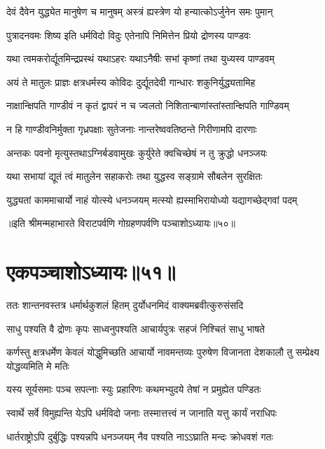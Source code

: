 \twolineshloka
{देवं दैवेन युद्ध्येत मानुषेण च मानुषम्}
{अस्त्रं ह्यस्त्रेण यो हन्यात्कोऽर्जुनेन समः पुमान्}


\twolineshloka
{पुत्रादनवमः शिष्य इति धर्मविदो विदुः}
{एतेनापि निमित्तेन प्रियो द्रोणस्य पाण्डवः}


\twolineshloka
{यथा त्वमकरोर्द्यूतमिन्द्रप्रस्थं यथाऽहरः}
{यथाऽनैषीः सभां कृष्णां तथा युध्यस्व पाण्डवम्}


\twolineshloka
{अयं ते मातुलः प्राज्ञः क्षत्रधर्मस्य कोविदः}
{दुर्द्यूतदेवी गान्धारः शकुनिर्युद्ध्यतामिह}


\twolineshloka
{नाक्षान्क्षिपति गाण्डीवं न कृतं द्वापरं न च}
{ज्वलतो निशितान्बाणांस्तांस्तान्क्षिपति गाण्डिवम्}


\twolineshloka
{न हि गाण्डीवनिर्मुक्ता गृध्रपक्षाः सुतेजनाः}
{नान्तरेष्ववतिष्ठन्ते गिरीणामपि दारणाः}


\twolineshloka
{अन्तकः पवनो मृत्युस्तथाऽग्निर्बडवामुखः}
{कुर्युरेते क्वचिच्छेषं न तु क्रुद्धो धनञ्जयः}


\twolineshloka
{यथा सभायां द्यूतं त्वं मातुलेन सहाकरोः}
{तथा युद्धस्व सङ्ग्रामे सौबलेन सुरक्षितः}


\twolineshloka
{युद्ध्यतां काममाचार्यो नाहं योत्स्ये धनञ्जयम्}
{मत्स्यो ह्यस्माभिरायोध्यो यद्यागच्छेद्गवां पदम्}

॥इति श्रीमन्महाभारते विराटपर्वणि गोग्रहणपर्वणि पञ्चाशोऽध्यायः॥५०॥

\chapter{एकपञ्चाशोऽध्यायः॥५१॥}

\twolineshloka
{ततः शान्तनवस्तत्र धर्मार्थकुशलं हितम्}
{दुर्योधनमिदं वाक्यमब्रवीत्कुरुसंसदि}


\twolineshloka
{साधु पश्यति वै द्रोणः कृपः साध्वनुपश्यति}
{आचार्यपुत्रः सहजं निश्चितं साधु भाषते}


\threelineshloka
{कर्णस्तु क्षत्रधर्मेण केवलं योद्धुमिच्छति}
{आचार्यो नावमन्तव्यः पुरुषेण विजानता}
{देशकालौ तु सम्प्रेक्ष्य योद्धव्यमिति मे मतिः}


\twolineshloka
{यस्य सूर्यसमाः पञ्च सपत्नाः स्युः प्रहारिणः}
{कथमभ्युदये तेषां न प्रमुह्येत पण्डितः}


\twolineshloka
{स्वार्थे सर्वे विमुह्यन्ति येऽपि धर्मविदो जनाः}
{तस्मात्तत्त्वं न जानाति यत्तु कार्यं नराधिपः}


\twolineshloka
{धार्तराष्ट्रोऽपि दुर्बुद्धिः पश्यन्नपि धनञ्जयम्}
{नैव पश्यति नाऽऽघ्राति मन्दः क्रोधवशं गतः}



